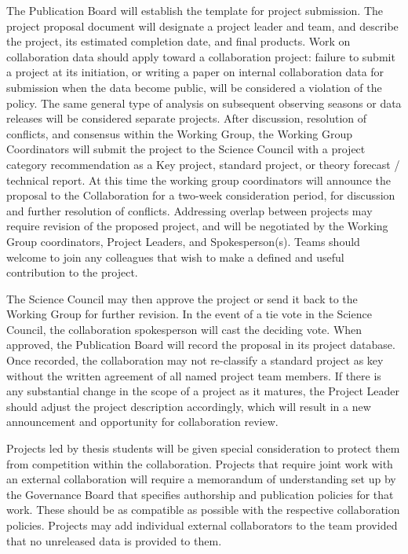 The Publication Board will establish the template for project submission.  The project proposal document will designate a project leader and team, and describe the project, its estimated completion date, and final products.  Work on collaboration data should apply toward a collaboration project: failure to submit a project at its initiation, or writing a paper on internal collaboration data for submission when the data become public, will be considered a violation of the policy.  The same general type of analysis on subsequent observing seasons or data releases will be considered separate projects.  After discussion, resolution of conflicts, and consensus within the Working Group, the Working Group Coordinators will submit the project to the Science Council with a project category recommendation as a Key project, standard project, or theory forecast / technical report.  At this time the working group coordinators will announce the proposal to the Collaboration for a two-week consideration period, for discussion and further resolution of conflicts.  Addressing overlap between projects may require revision of the proposed project, and will be negotiated by the Working Group coordinators, Project Leaders, and Spokesperson(s).  Teams should welcome to join any colleagues that wish to make a defined and useful contribution to the project.

The Science Council may then approve the project or send it back to the Working Group for further revision.  In the event of a tie vote in the Science Council, the collaboration spokesperson  will cast the deciding vote.  When approved, the Publication Board will record the proposal in its project database.  Once recorded, the collaboration may not re-classify a standard project as key without the written agreement of all named project team members.  If there is any substantial change in the scope of a project as it matures, the Project Leader should adjust the project description accordingly, which will result in a new announcement and opportunity for collaboration review.

Projects led by thesis students will be given special consideration to protect them from competition within the collaboration.  Projects that require joint work with an external collaboration will require a memorandum of understanding set up by the Governance Board that specifies authorship and publication policies for that work.  These should be as compatible as possible with the respective collaboration policies.  Projects may add individual external collaborators to the team provided that no unreleased data is provided to them.

